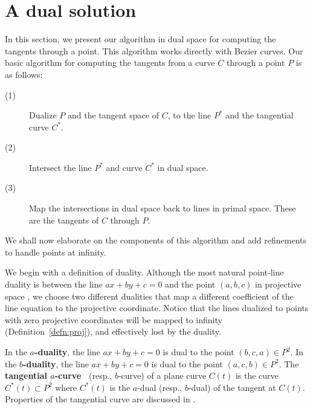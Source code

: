 \documentclass[11pt]{article}
\newcommand{\atang}{tangential $a$-curve\ }
\begin{document}
\section{A dual solution}
\label{sec:point}

In this section, we present our algorithm in dual space
for computing the tangents through a point.
This algorithm works directly with Bezier curves.
Our basic algorithm for computing the tangents from a curve $C$ through
a point $P$ is as follows:
%
\begin{description}
\item[(1)]	Dualize $P$ and the tangent space of $C$, to the line $P^*$
		and the tangential curve $C^*$.
\item[(2)]	Intersect the line $P^*$ and curve $C^*$ in dual space.
\item[(3)]	Map the intersections in dual space back to lines in primal space.
		These are the tangents of $C$ through $P$.
\end{description}
%
We shall now elaborate on the components of this algorithm
and add refinements to handle points at infinity.

We begin with a definition of duality.
Although the most natural point-line duality is between the line $ax+by+c=0$
and the point $(a,b,c)$ in projective space \cite{fulton69}, %
we choose two different dualities
that map a different coefficient of the line equation to the projective coordinate.
Notice that the lines dualized to points with zero projective coordinates
will be mapped to infinity (Definition~\ref{defn:proj}), and effectively lost by the duality.
\begin{defn2}
In the {\bf $a$-duality}, the line $ax+by+c=0$ is dual to the point $(b,c,a) \in P^2$.
In the {\bf $b$-duality}, the line $ax+by+c=0$ is dual to the point $(a,c,b) \in P^2$.
The {\bf \atang}  (resp., $b$-curve) of a plane curve $C(t)$
is the curve $C^*(t) \subset P^2$ where $C^*(t)$ is the $a$-dual
(resp., $b$-dual) of the tangent at $C(t)$.
Properties of the tangential curve are discussed in \cite{jj00}.
\end{defn2}
\end{document}
